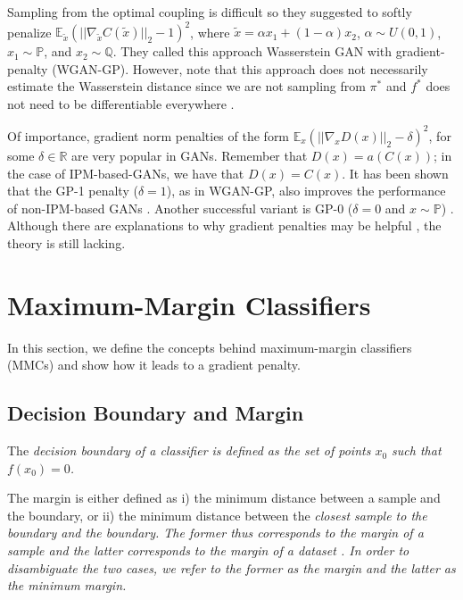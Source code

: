 \documentclass{article}
\begin{document}
Sampling from the optimal coupling is difficult so they suggested to softly penalize $\mathbb{E}_{\tilde{x}}{(||\nabla_{\tilde{x}} C(\tilde{x})||_2-1)^2}$, where $\tilde{x} =  \alpha x_1 + (1-\alpha)x_2$, $\alpha \sim U(0,1)$, $x_1 \sim \mathbb{P}$, and $x_2 \sim \mathbb{Q}$. They called this approach Wasserstein GAN with gradient-penalty (WGAN-GP). However, note that this approach does not necessarily estimate the Wasserstein distance since we are not sampling from $\pi^{*}$ and $f^{*}$ does not need to be differentiable everywhere \citep{petzka2017regularization}.

Of importance, gradient norm penalties of the form $\mathbb{E}_{x}{(||\nabla_{x} D(x)||_2-\delta)^2}$, for some $\delta \in \mathbb{R}$ are very popular in GANs. Remember that $D(x)=a(C(x))$; in the case of IPM-based-GANs, we have that $D(x)=C(x)$. It has been shown that the GP-1 penalty ($\delta=1$), as in WGAN-GP, also improves the performance of non-IPM-based GANs \citep{ManyPaths}. Another successful variant is GP-0 ($\delta=0$ and $x \sim \mathbb{P}$) \citep{mescheder2018training,karras2019style}. Although there are explanations to why gradient penalties may be helpful \citep{mescheder2018training, kodali2017convergence, WGAN-GP}, the theory is still lacking.

\section{Maximum-Margin Classifiers}
\label{sec:3}

In this section, we define the concepts behind maximum-margin classifiers (MMCs) and show how it leads to a gradient penalty.

\subsection{Decision Boundary and Margin}

The \em decision boundary \em of a classifier is defined as the set of points $x_0$ such that $f(x_0)=0$.

The margin is either defined as
i) the minimum distance between a sample and the boundary, or
ii) the minimum distance between the \em closest sample \em to the boundary and the boundary.
The former thus corresponds to the \em margin of a sample \em and the latter corresponds to the \em margin of a dataset \em.
In order to disambiguate the two cases, we refer to the former as the \em margin \em and the latter as the \em minimum margin\em.
\end{document}
